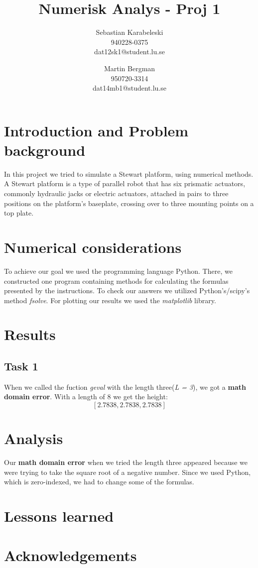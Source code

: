 \documentclass{article}
\title{Numerisk Analys - Proj 1}
\author{Sebastian Karabeleski\\940228-0375\\dat12sk1@student.lu.se \and Martin Bergman\\950720-3314\\dat14mb1@student.lu.se}
\date{}
\begin{document}
\maketitle

\section{Introduction and Problem background}
In this project we tried to simulate a Stewart platform, using numerical methods. A Stewart platform is a type of parallel robot that has six prismatic actuators, commonly hydraulic jacks or electric actuators, attached in pairs to three positions on the platform's baseplate, crossing over to three mounting points on a top plate. 


\section{Numerical considerations}
To achieve our goal we used the programming language Python. There, we constructed one program containing methods for calculating the formulas presented by the instructions.
To check our answers we utilized Python's/scipy's method \emph{fsolve}. For plotting our results we used the \emph{matplotlib} library.

\section{Results}
\subsection{Task 1}
When we called the fuction \emph{geval} with the length three(\emph{L = 3}), we got a \textbf{math domain error}. With a length of 8 we get the height:
\[[2.7838, 2.7838, 2.7838 ]\]

\section{Analysis}
Our \textbf{math domain error} when we tried the length three appeared because we were trying to take the square root of a negative number.
Since we used Python, which is zero-indexed, we had to change some of the formulas. 

\section{Lessons learned}

\section{Acknowledgements}
\end{document}
